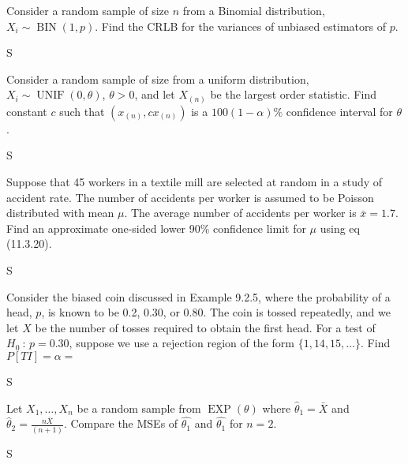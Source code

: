 \documentclass[answers]{exam}
\begin{document}
\begin{questions}
\question 
Consider a random sample of size \(n\) from a Binomial distribution,
\(X_i\sim\operatorname{BIN}(1,p)\). 
Find the CRLB for the variances of unbiased estimators of \(p\).
\begin{solution}
	S
\end{solution}

\question 
Consider a random sample of size from a uniform distribution,
\(X_i\sim\operatorname{UNIF}(0,\theta)\), \(\theta>0\),
and let \(X_{(n)}\) be the largest order statistic. 
Find constant \(c\) such that \((x_{(n)},cx_{(n)})\) is a \(100(1-\alpha)\%\) 
confidence interval for \(\theta\).
\begin{solution}
	S
\end{solution}

\question 
Suppose that 45 workers in a textile mill are selected at random in a study of accident rate. 
The number of accidents per worker is assumed to be Poisson distributed with mean \(\mu\). 
The average number of accidents per worker is \(\bar{x}=1.7\).
Find an approximate one-sided lower 90\% confidence limit for \(\mu\) 
using eq (11.3.20).
\begin{solution}
	S
\end{solution}

\question 
Consider the biased coin discussed in Example 9.2.5, where the probability of a head, 
\(p\), is known to be 0.2, 0.30, or 0.80. 
The coin is tossed repeatedly, 
and we let \(X\) be the number of tosses required to obtain the first head. 
For a test of \(H_0\ :\,p=0.30\), suppose we use a rejection region of the form
\(\{1,14,15,\ldots\}\). Find \(P\left[TI\right]=\alpha=\)
\begin{solution}
	S
\end{solution}

\question 
Let \(X_1,\ldots,X_n\) be a random sample from \(\operatorname{EXP}(\theta)\) where \(\hat{\theta}_1=\bar{X}\) and \(\hat{\theta}_2=\frac{n\bar{X}}{(n+1)}\). 
Compare the MSEs of \(\hat{\theta_1}\) and \(\hat{\theta_1}\) for \(n=2\).
\begin{solution}
	S
\end{solution}


\end{questions}
\end{document}
